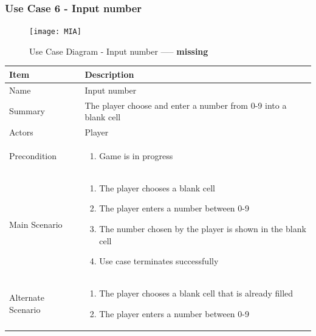 \documentclass[12pt]{article}
\begin{document}
\newpage


\subsubsection{Use Case 6 - Input number} \label{uc:6}

\begin{figure}[htbp]
    \centering
    \texttt{[image: MIA]}
    \caption{Use Case Diagram - Input number ----- \textbf{missing}}
    \label{fig:MIA}
\end{figure}

\begin{center}
\setlength{\tabcolsep}{18pt}
\renewcommand{\arraystretch}{1}
\begin{tabular}{ |p{3cm}|p{10cm}| }
    \hline
    \rowcolor{green}
   Item & Description \\
    \hline
    Name & Input number \\
    \hline
    Summary & The player choose and enter a number from 0-9 into a blank cell \\
    \hline
    Actors & Player \\
    \hline
    Precondition & 
    \vspace*{-0.2in}
    \begin{enumerate}
        \item Game is in progress
    \end{enumerate}  \\
    \hline
    Main Scenario &     
    \vspace*{-0.2in}
    \begin{enumerate}
        \item The player chooses a blank cell
        \item The player enters a number between 0-9
        \item The number chosen by the player is shown in the blank cell
        \item Use case terminates successfully
    \end{enumerate}  \\
    \hline
    Alternate Scenario &     
    \vspace*{-0.2in}
    \begin{enumerate}
        \item The player chooses a blank cell that is already filled
        \item The player enters a number between 0-9

\end{enumerate}
\end{tabular}
\end{center}
\end{document}
